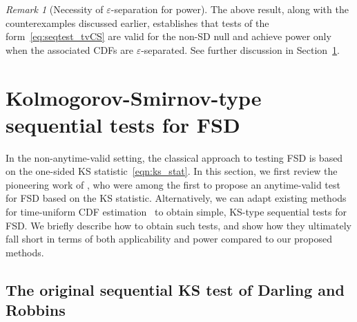\documentclass[12pt,twoside]{article}
\theoremstyle{plain}
\theoremstyle{definition}
\theoremstyle{remark}
\newtheorem{remark}{Remark}
\renewcommand{\epsilon}{\varepsilon}
\begin{document}
\begin{remark}[Necessity of $\epsilon$-separation for power] 
    The above result, along with the counterexamples discussed earlier, establishes that tests of the form~\eqref{eq:seqtest_tvCS} are valid for the non-SD null and achieve power only when the associated CDFs are $\epsilon$-separated. 
    See further discussion in Section~\ref{app:ks_test}.
\end{remark}





\section{Kolmogorov-Smirnov-type sequential tests for FSD}\label{app:ks_test}

In the non-anytime-valid setting, the classical approach to testing FSD is based on the one-sided KS statistic~\eqref{eqn:ks_stat}. In this section, we first review the pioneering work of \citet{darling1968some}, who were among the first to propose an anytime-valid test for FSD based on the KS statistic. Alternatively, we can adapt existing methods for time-uniform CDF estimation~\citep{howard2022sequential,manole2023martingale} to obtain simple, KS-type sequential tests for FSD. 
We briefly describe how to obtain such tests, and show how they ultimately fall short in terms of both applicability and power compared to our proposed methods.


\subsection{The original sequential KS test of Darling and Robbins}
\label{app:KS-darling-robbins}
\end{document}
